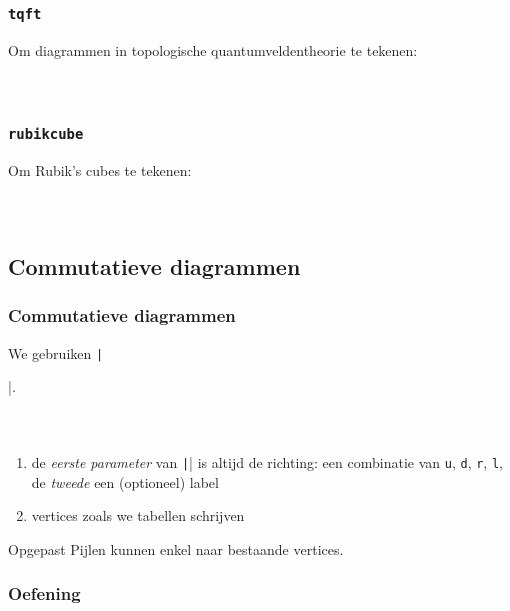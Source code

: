 \begin{frame}
  \frametitle{\texttt{tqft}}
  
  Om diagrammen in topologische quantumveldentheorie te tekenen:
  \begin{columns}
    \begin{column}{.6\textwidth}
      \inputminted[fontsize = \scriptsize]{latex}{tikz/tqft.tikz}
    \end{column}
    \begin{column}{.4\textwidth}
      
    \end{column}
  \end{columns}
\end{frame}

\begin{frame}
  \frametitle{\texttt{rubikcube}}

  Om Rubik's cubes te tekenen:
  \begin{columns}
    \begin{column}{.6\textwidth}
      \inputminted[fontsize = \scriptsize]{latex}{tikz/rubikcube.tikz}
    \end{column}
    \begin{column}{.4\textwidth}
      
    \end{column}
  \end{columns}
\end{frame}

\subsection{Commutatieve diagrammen}

\begin{frame}[fragile]
  \frametitle{Commutatieve diagrammen}

  \small
  We gebruiken \texttt|\usepackage{tikz-cd}|.
  \begin{columns}
    \begin{column}{.67\textwidth}
      \inputminted[fontsize = \scriptsize]{latex}{tikz/diagrams/1.tikz}
    \end{column}
    \begin{column}{.33\textwidth}
      
    \end{column}
  \end{columns}
  \small
  \begin{enumerate}
    \item\pause de \emph{eerste parameter} van \texttt|\arrow| is altijd de richting: een combinatie van \texttt{u}, \texttt{d}, \texttt{r}, \texttt{l}, de \emph{tweede} een (optioneel) label
    \item\pause vertices zoals we tabellen schrijven 
  \end{enumerate}
  \begin{alertblock}{Opgepast}
    \dbend\quad Pijlen kunnen enkel naar bestaande vertices.
  \end{alertblock}
\end{frame}

\begin{frame}
  \frametitle{Oefening}

  \footnotesize
  
  
\end{frame}
